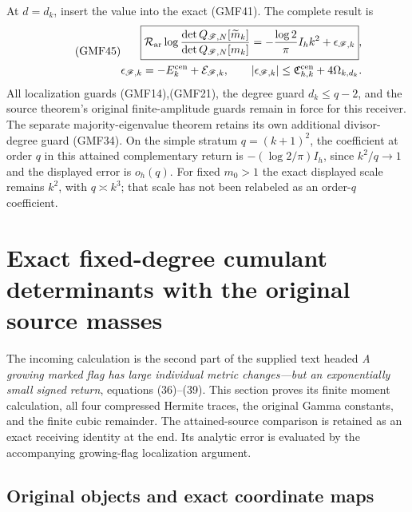 \documentclass[11pt,a4paper]{article}
\begin{document}
At \(d=d_k\), insert the value into the exact (GMF41).
The complete result is
\begin{equation}\tag{GMF45}
\begin{split}
 \boxed{
 \mathcal R_{\rm ar}
 \log\frac{\det Q_{\mathscr F,N}[\widetilde m_k]}
              {\det Q_{\mathscr F,N}[m_k]}
 =-\frac{\log2}{\pi}I_h k^2+\epsilon_{\mathscr F,k}},\\
 \epsilon_{\mathscr F,k}=-E_k^{\rm cen}+\mathcal E_{\mathscr F,k},
 \qquad
 |\epsilon_{\mathscr F,k}|
 \le\mathfrak C_{h,k}^{\rm cen}+4\Omega_{k,d_k}.
\end{split}
\end{equation}
All localization guards (GMF14),(GMF21), the degree
guard \(d_k\le q-2\), and the source theorem's original
finite-amplitude guards remain in force for this receiver.
The separate majority-eigenvalue theorem retains its
own additional divisor-degree guard (GMF34).
On the simple stratum \(q=(k+1)^2\), the coefficient at
order \(q\) in this attained complementary return is
\(-(\log2/\pi)I_h\), since \(k^2/q\to1\) and the displayed
error is \(o_h(q)\).
For fixed \(m_0>1\) the exact displayed scale remains
\(k^2\), with \(q\asymp k^3\); that scale has not been
relabeled as an order-\(q\) coefficient.

\section{Exact fixed-degree cumulant determinants with the original source masses}
\label{a02gmf:sec:FCD}

The incoming calculation is the second part of the supplied text headed
\emph{A growing marked flag has large individual metric changes---but an
exponentially small signed return}, equations (36)--(39).
This section proves its finite moment calculation, all four compressed
Hermite traces, the original Gamma constants, and the finite cubic
remainder. The attained-source comparison is retained as an exact receiving
identity at the end. Its analytic error is evaluated by the accompanying
growing-flag localization argument.

\subsection{Original objects and exact coordinate maps}
\end{document}
